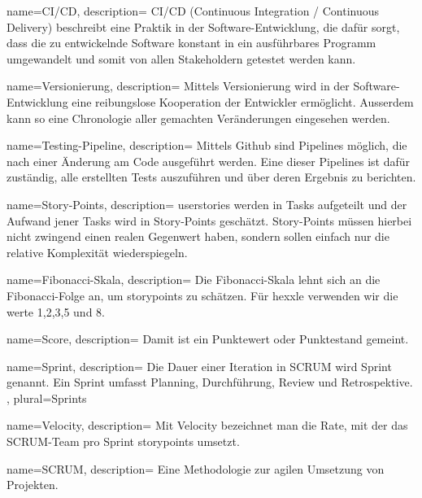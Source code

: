{
	name=CI/CD,
	description={
		CI/CD (Continuous Integration / Continuous Delivery) beschreibt eine Praktik in der Software-Entwicklung, die dafür sorgt, dass die zu entwickelnde Software konstant in ein ausführbares Programm umgewandelt und somit von allen Stakeholdern getestet werden kann.
	}
}

{
	name=Versionierung,
	description={
		Mittels Versionierung wird in der Software-Entwicklung eine reibungslose Kooperation der Entwickler ermöglicht. Ausserdem kann so eine Chronologie aller gemachten Veränderungen eingesehen werden.
	}
}

{
	name=Testing-Pipeline,
	description={
		Mittels Github sind Pipelines möglich, die nach einer Änderung am Code ausgeführt werden. Eine dieser Pipelines ist dafür zuständig, alle erstellten Tests auszuführen und über deren Ergebnis zu berichten.
	}
}

{
	name=Story-Points,
	description={
		\gls{userstories} werden in Tasks aufgeteilt und der Aufwand jener Tasks wird in Story-Points geschätzt. Story-Points müssen hierbei nicht zwingend einen realen Gegenwert haben, sondern sollen einfach nur die relative Komplexität wiederspiegeln.
	}
}

{
	name=Fibonacci-Skala,
	description={
		Die Fibonacci-Skala lehnt sich an die Fibonacci-Folge an, um \gls{storypoints} zu schätzen. Für \gls{hexxle} verwenden wir die werte 1,2,3,5 und 8.
	}
}

{
	name=Score,
	description={
		Damit ist ein Punktewert oder Punktestand gemeint.
	}
}

{
	name=Sprint,
	description={
		Die Dauer einer Iteration in SCRUM wird Sprint genannt. Ein Sprint umfasst Planning, Durchführung, Review und Retrospektive.
	},
	plural={Sprints}
}

{
	name=Velocity,
	description={
		Mit Velocity bezeichnet man die Rate, mit der das SCRUM-Team pro Sprint \gls{storypoints} umsetzt.
	}
}

{
	name=SCRUM,
	description={
		Eine Methodologie zur agilen Umsetzung von Projekten.
	}
}

